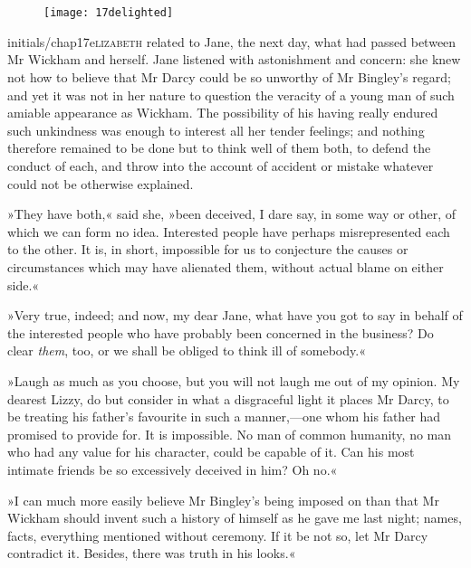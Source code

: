 \chapter[Chapter \thechapter]{}
	
\begin{figure}[t!]
	\centering
\texttt{[image: 17delighted]}
\end{figure}	
	
\lettrine[lines=6,image=true]{initials/chap17e}{lizabeth}  related to Jane, the next day, what had passed between Mr Wickham and herself. Jane listened with astonishment and concern: she knew not how to believe that Mr Darcy could be so unworthy of Mr Bingley's regard; and yet it was not in her nature to question the veracity of a young man of such amiable appearance as Wickham. The possibility of his having really endured such unkindness was enough to interest all her tender feelings; and nothing therefore remained to be done but to think well of them both, to defend the conduct of each, and throw into the account of accident or mistake whatever could not be otherwise explained.

»They have both,« said she, »been deceived, I dare say, in some way or other, of which we can form no idea. Interested people have perhaps misrepresented each to the other. It is, in short, impossible for us to conjecture the causes or circumstances which may have alienated them, without actual blame on either side.«

»Very true, indeed; and now, my dear Jane, what have you got to say in behalf of the interested people who have probably been concerned in the business? Do clear \textit{them}, too, or we shall be obliged to think ill of somebody.«

»Laugh as much as you choose, but you will not laugh me out of my opinion. My dearest Lizzy, do but consider in what a disgraceful light it places Mr Darcy, to be treating his father's favourite in such a manner,—one whom his father had promised to provide for. It is impossible. No man of common humanity, no man who had any value for his character, could be capable of it. Can his most intimate friends be so excessively deceived in him? Oh no.«

»I can much more easily believe Mr Bingley's being imposed on than that Mr Wickham should invent such a history of himself as he gave me last night; names, facts, everything mentioned without ceremony. If it be not so, let Mr Darcy contradict it. Besides, there was truth in his looks.«

